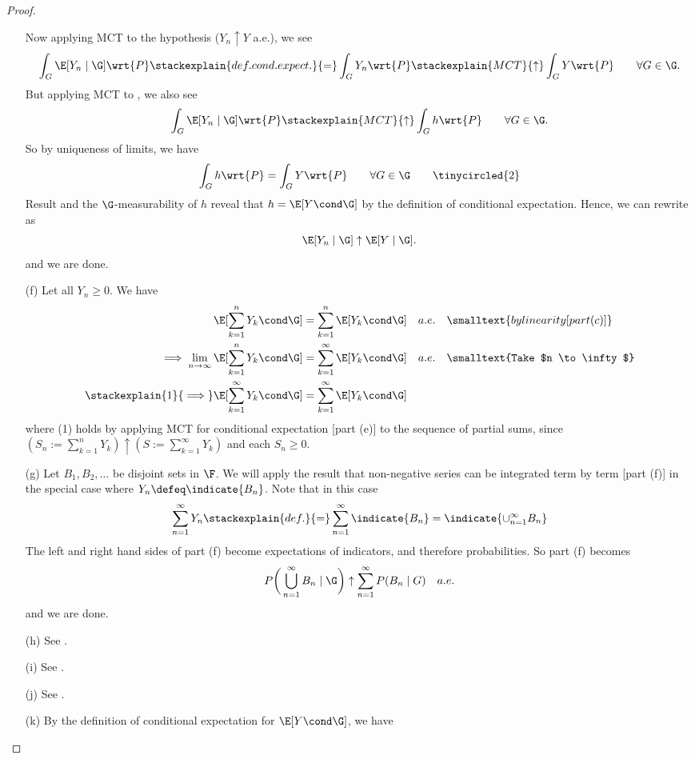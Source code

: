 \documentclass{article} %
\begin{document}
\begin{proof}
\begin{itemize}
Now applying MCT to the hypothesis ($Y_n \uparrow Y$ a.e.), we see
%
\[ \int_G \E[Y_n \mid \G] \wrt{P} \stackexplain{def. cond. expect.}{=} \int_G Y_n \wrt{P} \stackexplain{MCT}{\uparrow} \int_G Y \wrt{P} \quad \quad \forall G \in \G.\]
%
But applying MCT to , we also see 
%
\[ \int_G \E[Y_n \mid \G] \wrt{P} \stackexplain{MCT}{\uparrow} \int_G h \wrt{P} \quad \quad \forall G \in \G.\]
%
So by uniqueness of limits, we have 
\[ \int_G h \wrt{P} = \int_G Y \wrt{P} \quad \quad \forall G \in \G \quad \quad \tinycircled{2}\]
%
Result  and the $\G$-measurability of $h$ reveal that $h=\E[Y \cond \G]$ by the definition of conditional expectation.  Hence, we can rewrite  as
\[\E[Y_n \mid \G] \uparrow \E[Y \mid \G].\]   
and we are done.
%
\item[(f)]  Let all $Y_n \geq 0$. We have 
\begin{align*}
\E[ \sum_{k=1}^n Y_k \cond \G ] &=  \sum_{k=1}^n \E[  Y_k \cond \G ] \quad a.e.  && \smalltext{by linearity [part (c)]}	 \\
\implies \lim_{n \to \infty }\E[ \sum_{k=1}^n Y_k \cond \G ] &=  \sum_{k=1}^\infty \E[  Y_k \cond \G ] \quad a.e. && \smalltext{Take $n \to \infty$} \\
\stackexplain{1}{\implies}  \E[ \sum_{k=1}^\infty Y_k \cond \G ] &=  \sum_{k=1}^\infty \E[  Y_k \cond \G ]
\end{align*}
where (1) holds by applying MCT for conditional expectation [part (e)] to the sequence of partial sums, since $(S_n := \sum_{k=1}^n Y_k) \uparrow (S:= \sum_{k=1}^\infty Y_k)$ and each $S_n \geq 0$.
%
\item[(g)] Let $B_1, B_2, \hdots$ be disjoint sets in $\F$.  We will apply the result that non-negative series can be integrated term by term [part (f)] in the special case where $Y_n \defeq \indicate{B_n}$.   Note that in this case 
%
\[  \sum_{n=1}^\infty Y_n \stackexplain{def.}{=}  \sum_{n=1}^\infty  \indicate{B_n} = \indicate{\cup_{n=1}^\infty B_n}\]
%
The left and right hand sides of part (f) become expectations of indicators, and therefore probabilities.  So part (f) becomes
\[ P \bigg( \bigcup_{n=1}^\infty B_n \mid \G \bigg) \uparrow \sum_{n=1}^\infty P(B_n \mid G) \quad a.e. \]
and we are done.
\item[(h)] See \cite[Thm.~5.5.5]{ash2000probability}.
\item[(i)] See \cite[Thm.~5.5.6a]{ash2000probability}.
\item[(j)] See \cite[Thm.~5.5.6b]{ash2000probability}.
\item[(k)] By the definition of conditional expectation for $\E[Y \cond \G]$, we have

\end{itemize}
\end{proof}
\end{document}
